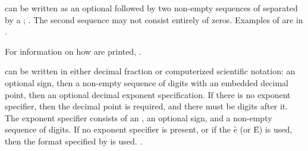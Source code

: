 
 can be written as an optional  followed by two
non-empty sequences of  separated by a ;
\seefigure\SyntaxForNumericTokens.
The second sequence may not consist
entirely of zeros.
Examples of  are in \thenextfigure.



For information on how  are printed,
\seesection\PrintingRatios.

\endsubsubsubsection%

\endsubsubsection%


 can be written in either decimal fraction or computerized
scientific notation: an optional sign, then a non-empty sequence of digits
with an embedded decimal point,
then an optional decimal exponent specification.
If there is no exponent specifier, then
the decimal point is required, and there must be digits
after it.
The exponent specifier consists of an ,
an optional sign, and a non-empty sequence of digits.
If no exponent specifier is present, or if the  \f{e}
(or \f{E}) is used, then
the format specified
by  is used.
\Seefigure\SyntaxForNumericTokens.

